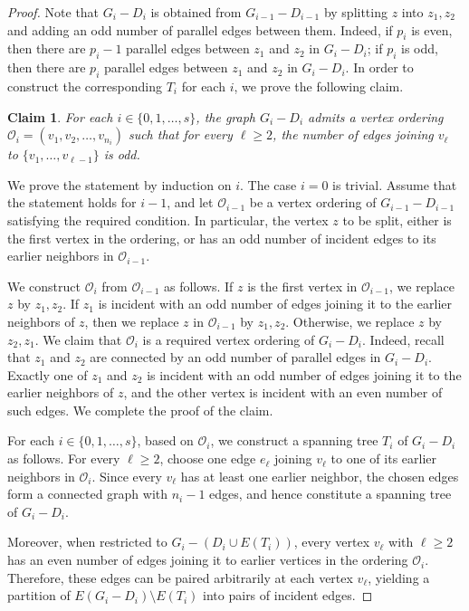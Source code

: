 \documentclass[a4paper,12pt]{article}
\theoremstyle{plain}
\newtheorem{claim}[claim]{Claim}
\theoremstyle{definition}
\theoremstyle{remark}
\numberwithin{equation}{section}
\renewcommand{\qedsymbol}{\ensuremath{\square}}
\newenvironment{proof*}[1][Proof]
{\begin{proof}[#1]}
{\renewcommand{\qedsymbol}{$\blacksquare$}\end{proof}}
\begin{document}
\begin{proof}
Note that $G_i-D_i$ is obtained from $G_{i-1}-D_{i-1}$ by splitting $z$ into $z_1,z_2$ and adding an odd number of parallel edges between them. Indeed, if $p_i$ is even, then there are $p_i-1$ parallel edges between $z_1$ and $z_2$ in $G_i-D_i$; if $p_i$ is odd, then there are $p_i$ parallel edges between $z_1$ and $z_2$ in $G_i-D_i$.  
In order to construct the corresponding $T_i$ for each $i$, we prove the following claim.

\begin{claim}\label{claim:order}
For each $i\in \{0,1,\ldots, s\}$, the graph $G_i-D_i$ admits a vertex ordering $\mathcal{O}_i=(v_1, v_2, \ldots, v_{n_i})$ such that for every $\ell\geq 2$, the number of edges joining $v_\ell$ to $\{v_1,\ldots,v_{\ell-1}\}$ is odd.  
\end{claim}
\begin{proof*}
We prove the statement by induction on $i$. The case $i=0$ is trivial. Assume that the statement holds for $i-1$, and let $\mathcal{O}_{i-1}$ be a vertex ordering of $G_{i-1}-D_{i-1}$ satisfying the required condition. In particular, the vertex $z$ to be split, either is the first vertex in the ordering, or has an odd number of incident edges to its earlier neighbors in $\mathcal{O}_{i-1}$.

We construct $\mathcal{O}_i$ from $\mathcal{O}_{i-1}$ as follows. If $z$ is the first vertex in $\mathcal{O}_{i-1}$, we replace $z$ by $z_1,z_2$. If $z_1$ is incident with an odd number of edges joining it to the earlier neighbors of $z$, then we replace $z$ in $\mathcal{O}_{i-1}$ by $z_1,z_2$. Otherwise, we replace $z$ by $z_2,z_1$.
We claim that $\mathcal{O}_i$ is a required vertex ordering of $G_i-D_i$. Indeed, recall that $z_1$ and $z_2$ are connected by an odd number of parallel edges in $G_i-D_i$. Exactly one of $z_1$ and $z_2$ is incident with an odd number of edges joining it to the earlier neighbors of $z$, and the other vertex is incident with an even number of such edges. We complete the proof of the claim.
\end{proof*}

For each $i\in \{0,1,\ldots, s\}$, based on $\mathcal{O}_i$, we construct a spanning tree $T_i$ of $G_i-D_i$ as follows. For every $\ell\geq 2$, choose one edge $e_\ell$ joining $v_\ell$ to one of its earlier neighbors in $\mathcal{O}_i$. Since every $v_\ell$ has at least one earlier neighbor, the chosen edges form a connected graph with $n_i-1$ edges, and hence constitute a spanning tree of $G_i-D_i$.

Moreover, when restricted to $G_i-(D_i\cup E(T_i))$, every vertex $v_\ell$ with $\ell\ge2$ has an even number of edges joining it to earlier vertices in the ordering $\mathcal{O}_i$. Therefore, these edges can be paired arbitrarily at each vertex $v_\ell$, yielding a partition of $E(G_i-D_i)\setminus E(T_i)$ into pairs of incident edges.
\end{proof}
\end{document}
